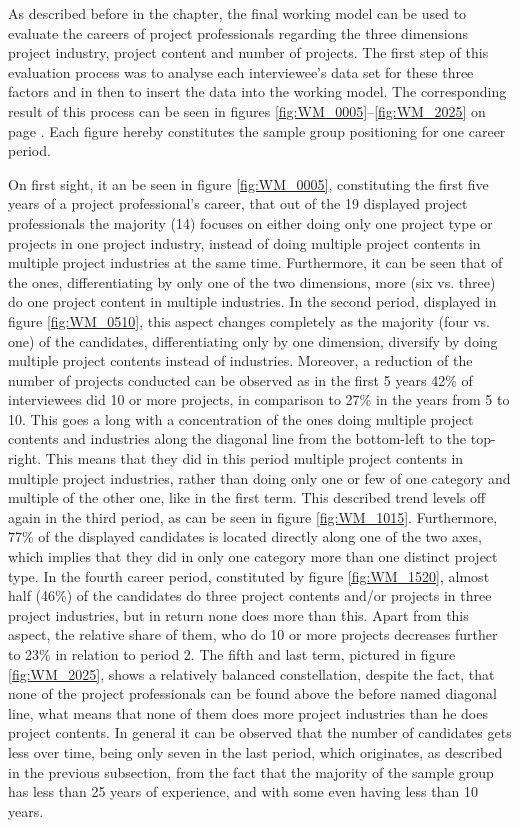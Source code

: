 As described before in the  chapter, the final working model can be used to evaluate the careers of project professionals regarding the three dimensions project industry, project content and number of projects. The first step of this evaluation process was to analyse each interviewee's data set for these three factors and in then to insert the data into the working model. The corresponding result of this process can be seen in figures \ref{fig:WM_0005}–\ref{fig:WM_2025} on page \pageref{fig:WM_0005}. Each figure hereby constitutes the sample group positioning for one career period.

On first sight, it an be seen in figure \ref{fig:WM_0005}, constituting the first five years of a project professional's career, that out of the 19 displayed project professionals the majority (14) focuses on either doing only one project type or projects in one project industry, instead of doing multiple project contents in multiple project industries at the same time. Furthermore, it can be seen that of the ones, differentiating by only one of the two dimensions, more (six vs. three) do one project content in multiple industries.
In the second period, displayed in figure \ref{fig:WM_0510}, this aspect changes completely as the majority (four vs. one) of the candidates, differentiating only by one dimension, diversify by doing multiple project contents instead of industries. Moreover, a reduction of the number of projects conducted can be observed as in the first 5 years 42\% of interviewees did 10 or more projects, in comparison to 27\% in the years from 5 to 10. This goes a long with a concentration of the ones doing multiple project contents and industries along the diagonal line from the bottom-left to the top-right. This means that they did in this period multiple project contents in multiple project industries, rather than doing only one or few of one category and multiple of the other one, like in the first term.
This described trend levels off again in the third period, as can be seen in figure \ref{fig:WM_1015}. Furthermore, 77\% of the displayed candidates is located directly along one of the two axes, which implies that they did in only one category more than one distinct project type. 
In the fourth career period, constituted by figure \ref{fig:WM_1520}, almost half (46\%) of the candidates do three project contents and/or projects in three project industries, but in return none does more than this. Apart from this aspect, the relative share of them, who do 10 or more projects decreases further to 23\% in relation to period 2.
The fifth and last term, pictured in figure \ref{fig:WM_2025}, shows a relatively balanced constellation, despite the fact, that none of the project professionals can be found above the before named diagonal line, what means that none of them does more project industries than he does project contents. In general it can be observed that the number of candidates gets less over time, being only seven in the last period, which originates, as described in the previous subsection, from the fact that the majority of the sample group has less than 25 years of experience, and with some even having less than 10 years. 

